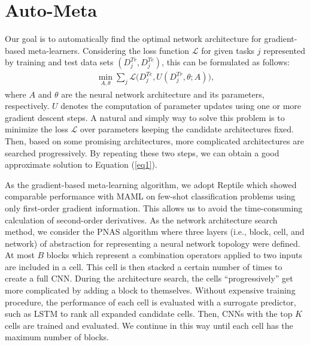 \documentclass{article}
\begin{document}
\section{Auto-Meta}
Our goal is to automatically find the optimal network architecture for gradient-based meta-learners. Considering the loss function $\mathcal{L}$ for given tasks $j$ represented by training and test data sets $(D_{j}^{Tr},D_{j}^{Te})$, this can be formulated as follows:
\begin{eqnarray}
\min_{A,\theta} \sum_{j} \mathcal{L} \big (D_{j}^{Te}, U(D_{j}^{Tr},\theta;A) \big ),
\label{eq1}
\end{eqnarray}
where $A$ and $\theta$ are the neural network architecture and its parameters, respectively. $U$ denotes the computation of parameter updates using one or more gradient descent steps.
A natural and simply way to solve this problem is to minimize the loss $\mathcal{L}$ over parameters keeping the candidate architectures fixed. Then, based on some promising architectures, more complicated architectures are searched progressively. By repeating these two steps, we can obtain a good approximate solution to Equation (\ref{eq1}).

As the gradient-based meta-learning algorithm, we adopt Reptile \cite{nichol:reptile:DBLP:journals/corr/abs-1803-02999} which showed comparable performance with MAML \cite{finn:maml:DBLP:conf/icml/FinnAL17} on few-shot classification problems using only first-order gradient information. This allows us to avoid the time-consuming calculation of second-order derivatives.
As the network architecture search method, we consider the PNAS algorithm \cite{liu:pnas_google:DBLP:journals/corr/abs-1712-00559} where three layers (i.e., block, cell, and network) of abstraction for representing a neural network topology were defined. At most $B$ blocks which represent a combination operators applied to two inputs are included in a cell. This cell is then stacked a certain number of times to create a full CNN. During the architecture search, the cells ``progressively'' get more complicated by adding a block to themselves. Without expensive training procedure, the performance of each cell is evaluated with a surrogate predictor, such as LSTM to rank all expanded candidate cells. Then, CNNs with the top $K$ cells are trained and evaluated. We continue in this way until each cell has the maximum number of blocks.
\end{document}
